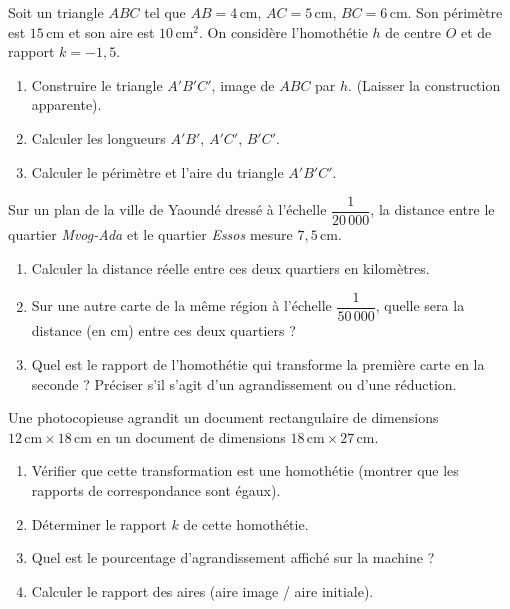 \documentclass[11pt]{article}
\begin{document}
\begin{exercice}
Soit un triangle $ABC$ tel que $AB = 4\,\text{cm}$, $AC = 5\,\text{cm}$, $BC = 6\,\text{cm}$. Son périmètre est $15\,\text{cm}$ et son aire est $10\,\text{cm}^2$.
On considère l'homothétie $h$ de centre $O$ et de rapport $k = -1,5$.
\begin{enumerate}
\item Construire le triangle $A'B'C'$, image de $ABC$ par $h$. (Laisser la construction apparente).
\item Calculer les longueurs $A'B'$, $A'C'$, $B'C'$.
\item Calculer le périmètre et l'aire du triangle $A'B'C'$.
\end{enumerate}
\end{exercice}
\begin{exercice}
Sur un plan de la ville de Yaoundé dressé à l'échelle $\dfrac{1}{20\,000}$, la distance entre le quartier \emph{Mvog-Ada} et le quartier \emph{Essos} mesure $7,5\,\text{cm}$.
\begin{enumerate}
\item Calculer la distance réelle entre ces deux quartiers en kilomètres.
\item Sur une autre carte de la même région à l'échelle $\dfrac{1}{50\,000}$, quelle sera la distance (en cm) entre ces deux quartiers ?
\item Quel est le rapport de l'homothétie qui transforme la première carte en la seconde ? Préciser s'il s'agit d'un agrandissement ou d'une réduction.
\end{enumerate}
\end{exercice}
\begin{exercice}
Une photocopieuse agrandit un document rectangulaire de dimensions $12\,\text{cm} \times 18\,\text{cm}$ en un document de dimensions $18\,\text{cm} \times 27\,\text{cm}$.
\begin{enumerate}
\item Vérifier que cette transformation est une homothétie (montrer que les rapports de correspondance sont égaux).
\item Déterminer le rapport $k$ de cette homothétie.
\item Quel est le pourcentage d'agrandissement affiché sur la machine ?
\item Calculer le rapport des aires (aire image / aire initiale).
\end{enumerate}
\end{exercice}
\end{document}
